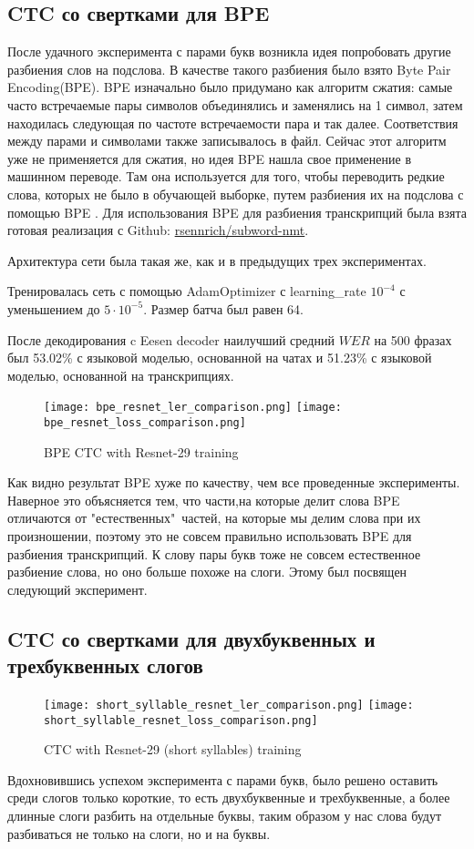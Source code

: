 \documentclass[a4paper,14pt]{extarticle}
\begin{document}
\subsection{CTC со свертками для BPE}
После удачного эксперимента с парами букв возникла идея попробовать другие разбиения слов на подслова. В качестве такого разбиения было взято Byte Pair Encoding(BPE). BPE изначально было придумано как алгоритм сжатия: самые часто встречаемые пары символов объединялись и заменялись на 1 символ, затем находилась следующая по частоте встречаемости пара и так далее. Соответствия между парами и символами также записывалось в файл. Сейчас этот алгоритм уже не применяется для сжатия, но идея BPE нашла свое применение в машинном переводе. Там она используется для того, чтобы переводить редкие слова, которых не было в обучающей выборке, путем разбиения их на подслова с помощью BPE \cite{subword_nmt}. Для использования BPE для разбиения транскрипций была взята готовая реализация с Github: \href{https://github.com/rsennrich/subword-nmt}{rsennrich/subword-nmt}.

Архитектура сети была такая же, как и в предыдущих трех экспериментах. 

Тренировалась сеть с помощью AdamOptimizer с learning\_rate $10^{-4}$ с уменьшением до $5\cdot10^{-5}$. Размер батча был равен 64. 

После декодирования c Eesen decoder наилучший средний $WER$ на 500 фразах был 53.02\% с языковой моделью, основанной на чатах и 51.23\% с языковой моделью, основанной на транскрипциях. 
\begin{figure}[!ht]
	\texttt{[image: bpe\_resnet\_ler\_comparison.png]}%
	\texttt{[image: bpe\_resnet\_loss\_comparison.png]}
	\caption{BPE CTC with Resnet-29 training}
	\label{bpe_resnet_train}
\end{figure}

Как видно результат BPE хуже по качеству, чем все проведенные эксперименты. Наверное это объясняется тем, что части,на которые делит слова BPE отличаются от "естественных"\ частей, на которые мы делим слова при их произношении, поэтому это не совсем правильно использовать BPE для разбиения транскрипций. К слову пары букв тоже не совсем естественное разбиение слова, но оно больше похоже на слоги. Этому был посвящен следующий эксперимент.
\subsection{CTC со свертками для двухбуквенных и трехбуквенных слогов}
\begin{figure}[!ht]
	\texttt{[image: short\_syllable\_resnet\_ler\_comparison.png]}%
	\texttt{[image: short\_syllable\_resnet\_loss\_comparison.png]}
	\caption{CTC with Resnet-29 (short syllables) training}
	\label{short_syllable_resnet_train}
\end{figure}
Вдохновившись успехом эксперимента с парами букв, было решено оставить среди слогов только короткие, то есть двухбуквенные и трехбуквенные, а более длинные слоги разбить на отдельные буквы, таким образом у нас слова будут разбиваться не только на слоги, но и на буквы. 
\end{document}
